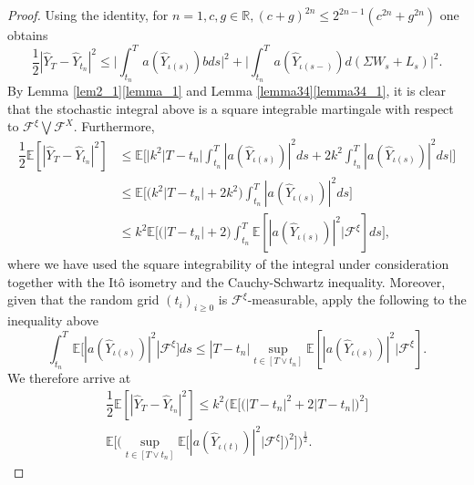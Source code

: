 \begin{proof}
Using the identity, for $n=1, c,g \in \mathbb{R}, (c + g)^{2n} \leq 2^{2n-1}(c^{2n} + g^{2n})$ one obtains
\begin{equation*}
    \dfrac{1}{2}|\hat{Y}_{T} - \hat{Y}_{t_{n}}|^2 \leq \bigg|\int^{T}_{t_n} a(\hat{Y}_{\iota(s)})bds \bigg|^2 + \bigg|\int^{T}_{t_n}a(\hat{Y}_{\iota(s-)})d(\Sigma W_s + L_s) \bigg|^2.
\end{equation*}
By Lemma \ref{lem2_1}\ref{lemma_1} and Lemma \ref{lemma34}\ref{lemma34_1}, it is clear that the stochastic integral above is a square integrable martingale with respect to $\mathcal{F}^{\xi} \bigvee \mathcal{F}^{X}$. Furthermore, 
\begin{equation*}
    \begin{split}
        \dfrac{1}{2} \mathbb{E} [|\hat{Y}_{T} - \hat{Y}_{t_{n}}|^2] &\leq \mathbb{E} \Bigg[ \bigg| k^2 |T -  t_n| \int^{T}_{t_n} |a(\hat{Y}_{\iota(s)})|^2ds + 2k^2 \int^{T}_{t_n} |a(\hat{Y}_{\iota(s)})|^2ds \bigg|\Bigg]\\
        &\leq \mathbb{E}\Bigg[  \big(k^2 |T -  t_n|+2k^2\big) \int^{T}_{t_n} |a(\hat{Y}_{\iota(s)})|^2ds \Bigg]\\
        &\leq k^2 \mathbb{E}\Bigg[  \big(|T -  t_n|+2\big) \int^{T}_{t_n} \mathbb{E}[|a(\hat{Y}_{\iota(s)})|^2|\mathcal{F}^{\xi}]ds \Bigg],
    \end{split}
\end{equation*}
where we have used the square integrability of the integral under consideration together with the It\^o isometry and the Cauchy-Schwartz inequality. Moreover, given that the random grid $(t_{i})_{i \geq 0}$ is  $\mathcal{F}^{\xi}$-measurable, apply the following to the inequality above
\begin{equation*}
    \int^{T}_{t_n} \mathbb{E}[|a(\hat{Y}_{\iota(s)})|^2|\mathcal{F}^{\xi}]ds \leq |T -  t_n|\sup_{t \in [T \lor t_n]}\mathbb{E}[|a(\hat{Y}_{\iota(s)})|^2|\mathcal{F}^{\xi}].
\end{equation*}
We therefore arrive at 
    \begin{multline}\label{eq_swords}
        \dfrac{1}{2} \mathbb{E} [|\hat{Y}_{T} - \hat{Y}_{t_{n}}|^2] \leq k^2 \Bigg(\mathbb{E} \big[ \big(|T -  t_n|^2 + 2|T-t_n|\big)^2\big]\\
        \mathbb{E} \bigg[\bigg(\sup_{t \in [T \lor t_n]}\mathbb{E} \big[|a(\hat{Y}_{\iota(t)})|^2|\mathcal{F}^{\xi}\big]\bigg)^2\bigg] \Bigg)^{\frac{1}{2}}.
    \end{multline}

\end{proof}
